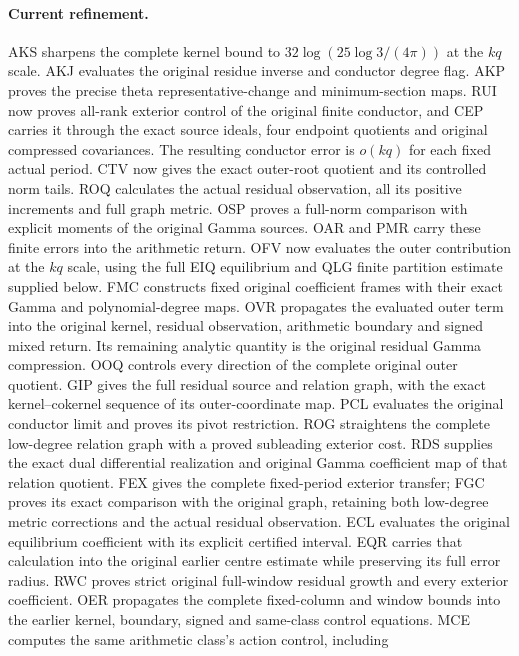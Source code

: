 \documentclass[11pt,a4paper]{article}
\begin{document}
\paragraph{Current refinement.}
AKS sharpens the complete kernel bound to
$32\log(25\log3/(4\pi))$ at the $kq$ scale. AKJ evaluates the
original residue inverse and conductor degree flag. AKP proves the
precise theta representative-change and minimum-section maps.
RUI now proves all-rank exterior control of the original finite
conductor, and CEP carries it through the exact source ideals,
four endpoint quotients and original compressed covariances.
The resulting conductor error is $o(kq)$ for each fixed actual period.
CTV now gives the exact outer-root quotient and its controlled
norm tails. ROQ calculates the actual residual observation, all its
positive increments and full graph metric. OSP proves a full-norm
comparison with explicit moments of the original Gamma sources.
OAR and PMR carry these finite errors into the arithmetic return.
OFV now evaluates the outer contribution at the $kq$ scale, using
the full EIQ equilibrium and QLG finite partition estimate supplied
below. FMC constructs fixed original coefficient frames with their
exact Gamma and polynomial-degree maps. OVR propagates the evaluated
outer term into the original kernel, residual observation, arithmetic
boundary and signed mixed return. Its remaining analytic quantity is
the original residual Gamma compression.
OOQ controls every direction of the complete original outer quotient.
GIP gives the full residual source and relation graph, with the exact
kernel--cokernel sequence of its outer-coordinate map. PCL evaluates
the original conductor limit and proves its pivot restriction.
ROG straightens the complete low-degree relation graph with a proved
subleading exterior cost. RDS supplies the exact dual differential
realization and original Gamma coefficient map of that relation quotient.
FEX gives the complete fixed-period exterior transfer; FGC proves its
exact comparison with the original graph, retaining both low-degree
metric corrections and the actual residual observation. ECL evaluates
the original equilibrium coefficient with its explicit certified interval.
EQR carries that calculation into the original earlier centre estimate
while preserving its full error radius. RWC proves strict original
full-window residual growth and every exterior coefficient. OER
propagates the complete fixed-column and window bounds into the
earlier kernel, boundary, signed and same-class control equations.
MCE computes the same arithmetic class's action control, including
\end{document}

